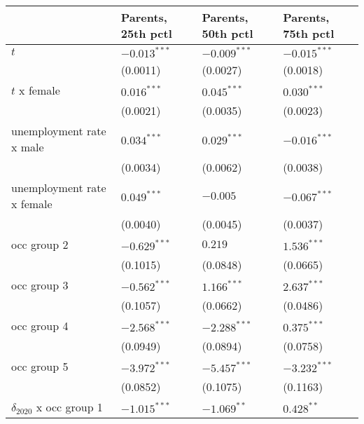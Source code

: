 \begin{tabular}{llll}
\toprule
{} & Parents, 25th pctl & Parents, 50th pctl & Parents, 75th pctl \\
\midrule
$t$                                    &     $-0.013^{***}$ &     $-0.009^{***}$ &     $-0.015^{***}$ \\
                                       &           (0.0011) &           (0.0027) &           (0.0018) \\
$t$ x female                           &      $0.016^{***}$ &      $0.045^{***}$ &      $0.030^{***}$ \\
                                       &           (0.0021) &           (0.0035) &           (0.0023) \\
unemployment rate x male               &      $0.034^{***}$ &      $0.029^{***}$ &     $-0.016^{***}$ \\
                                       &           (0.0034) &           (0.0062) &           (0.0038) \\
unemployment rate x female             &      $0.049^{***}$ &           $-0.005$ &     $-0.067^{***}$ \\
                                       &           (0.0040) &           (0.0045) &           (0.0037) \\
occ group 2                            &     $-0.629^{***}$ &            $0.219$ &      $1.536^{***}$ \\
                                       &           (0.1015) &           (0.0848) &           (0.0665) \\
occ group 3                            &     $-0.562^{***}$ &      $1.166^{***}$ &      $2.637^{***}$ \\
                                       &           (0.1057) &           (0.0662) &           (0.0486) \\
occ group 4                            &     $-2.568^{***}$ &     $-2.288^{***}$ &      $0.375^{***}$ \\
                                       &           (0.0949) &           (0.0894) &           (0.0758) \\
occ group 5                            &     $-3.972^{***}$ &     $-5.457^{***}$ &     $-3.232^{***}$ \\
                                       &           (0.0852) &           (0.1075) &           (0.1163) \\
$\delta_{2020}$ x occ group 1          &     $-1.015^{***}$ &      $-1.069^{**}$ &       $0.428^{**}$ \\

\end{tabular}
